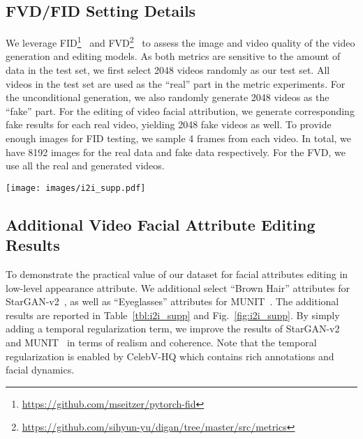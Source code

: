 \documentclass[runningheads]{llncs}
\begin{document}
\subsection{FVD/FID Setting Details}
\label{sec:setting_details}
We leverage FID\footnote{\href{https://github.com/mseitzer/pytorch-fid}{https://github.com/mseitzer/pytorch-fid}}~\cite{fid} and FVD\footnote{\href{https://github.com/sihyun-yu/digan/tree/master/src/metrics}{https://github.com/sihyun-yu/digan/tree/master/src/metrics}}~\cite{fvd} to assess the image and video quality of the video generation and editing models. As both metrics are sensitive to the amount of data in the test set, we first select 2048 videos randomly as our test set. All videos in the test set are used as the ``real'' part in the metric experiments. 
For the unconditional generation, we also randomly generate 2048 videos as the ``fake'' part.
For the editing of video facial attribution, we generate corresponding fake results for each real video, yielding 2048 fake videos as well.
To provide enough images for FID testing, we sample 4 frames from each video. In total, we have 8192 images for the real data and fake data respectively. 
For the FVD, we use all the real and generated videos.

\begin{figure*}[t]
\centering
\texttt{[image: images/i2i\_supp.pdf]}
\caption{\textbf{Qualitative results of video facial attribute editing.} In (a), we edit the attribute \emph{brown hair} with StarGAN-v2~\cite{starganv2}. In (b), we edit the attribute \emph{eyeglasses} with MUNIT~\cite{munit}. }
\label{fig:i2i_supp}
\vspace{-1mm}
\end{figure*}

\subsection{Additional Video Facial Attribute Editing Results}
\label{sec:additional_editing_results}
To demonstrate the practical value of our dataset for facial attributes editing in low-level appearance attribute. We additional select ``Brown Hair'' attributes for StarGAN-v2~\cite{starganv2}, as well as ``Eyeglasses'' attributes for MUNIT~\cite{munit}. 
The additional results are reported in Table~\ref{tbl:i2i_supp} and Fig.~\ref{fig:i2i_supp}. By simply adding a temporal regularization term, we improve the results of StarGAN-v2~\cite{starganv2} and MUNIT~\cite{munit} in terms of realism and coherence. Note that the temporal regularization is enabled by CelebV-HQ which contains rich annotations and facial dynamics.
\end{document}

